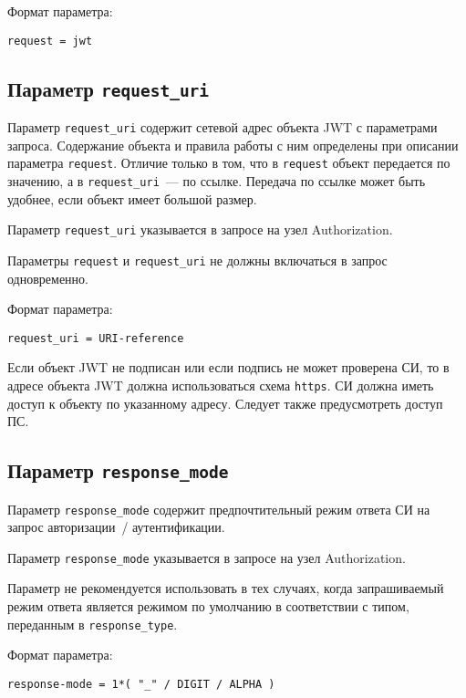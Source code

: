 Формат параметра:
\begin{lstlisting}
request = jwt
\end{lstlisting}

\subsection{Параметр \lstinline{request_uri}}\label{PARAMS.RequestUri} 

Параметр \lstinline{request_uri} содержит сетевой адрес объекта JWT с параметрами 
запроса. Содержание объекта и правила работы с ним определены при описании
параметра \lstinline{request}. Отличие только в том, что в \lstinline{request}
объект передается по значению, а в \lstinline{request_uri}~--- по ссылке.
%
Передача по ссылке может быть удобнее, если объект имеет большой размер.

Параметр \lstinline{request_uri} указывается в запросе на узел Authorization.

Параметры \lstinline{request} и \lstinline{request_uri} не должны включаться в 
запрос одновременно. 

Формат параметра:
\begin{lstlisting}
request_uri = URI-reference
\end{lstlisting}

Если объект JWT не подписан или если подпись не может проверена СИ, 
то в адресе объекта JWT должна использоваться схема \lstinline{https}.
%
СИ должна иметь доступ к объекту по указанному адресу.
%
Следует также предусмотреть доступ ПС.

\subsection{Параметр \lstinline{response_mode}}\label{PARAMS.RespMode} 

Параметр \lstinline{response_mode} содержит предпочтительный режим ответа СИ на 
запрос авторизации~/ аутентификации.

Параметр \lstinline{response_mode} указывается в запросе на узел Authorization.

Параметр не рекомендуется использовать в тех случаях, когда запрашиваемый 
режим ответа является режимом по умолчанию в соответствии с типом, переданным
в \lstinline{response_type}. 
%

Формат параметра:
\begin{lstlisting}
response-mode = 1*( "_" / DIGIT / ALPHA )
\end{lstlisting}

